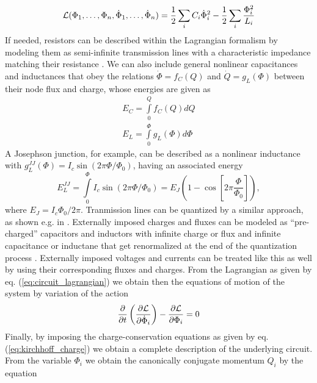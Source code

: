 %
\begin{equation}
\begin{mathcal}L\end{mathcal}(\Phi_1,\hdots,\Phi_n,\dot{\Phi}_1,\hdots,\dot{\Phi}_n) = \frac{1}{2}\sum\limits_i C_i \dot{\Phi}_i^2-\frac{1}{2}\sum\limits_i \frac{\Phi_i^2}{L_i} \label{eq:circuit_lagrangian}
\end{equation}
%
If needed, resistors can be described within the Lagrangian formalism by modeling them as semi-infinite transmission lines with a characteristic impedance matching their resistance \citep{yurke_quantum_1984}. We can also include general nonlinear capacitances and inductances that obey the relations $\dot{\Phi}=f_C(Q)$ and $\dot{Q}=g_L(\Phi)$ between their node flux and charge, whose energies are given as
%
\begin{eqnarray}
E_C = \int\limits_0^Q f_C(Q)dQ \\
E_L = \int\limits_0^\Phi g_L(\Phi)d\Phi
\end{eqnarray}
%
A Josephson junction, for example, can be described as a nonlinear inductance with $g_L^{JJ}(\Phi)=I_c\sin{(2\pi\Phi/\Phi_0)}$, having an associated energy
%
\begin{equation}
E_L^{JJ} = \int\limits_0^\Phi I_c\sin{\left(2\pi\Phi/\Phi_0\right)}=E_J(1-\cos{\left[2\pi\frac{\Phi}{\Phi_0}\right]}),
\end{equation}
%
where $E_J = I_c\Phi_0/2\pi$. Tranmission lines can be quantized by a similar approach, as shown e.g. in \citep{yurke_quantum_1984}. Externally imposed charges and fluxes can be modeled as ``pre-charged'' capacitors and inductors with infinite charge or flux and infinite capacitance or inductane that get renormalized at the end of the quantization process \citep{devoret_quantum_1995}. Externally imposed voltages and currents can be treated like this as well by using their corresponding fluxes and charges. From the Lagrangian as given by eq. (\ref{eq:circuit_lagrangian}) we obtain then the equations of motion of the system by variation of the action
%
\begin{equation}
\frac{\partial}{\partial t}\left( \frac{\partial \begin{mathcal}L\end{mathcal}}{\partial\dot{\Phi}_i}\right)-\frac{\partial \begin{mathcal}L\end{mathcal}}{\partial \Phi_i} = 0
\end{equation}
%
Finally, by imposing the charge-conservation equations as given by eq. (\ref{eq:kirchhoff_charge}) we obtain a complete description of the underlying circuit. From the variable $\Phi_i$ we obtain the canonically conjugate momentum $Q_i$ by the equation
